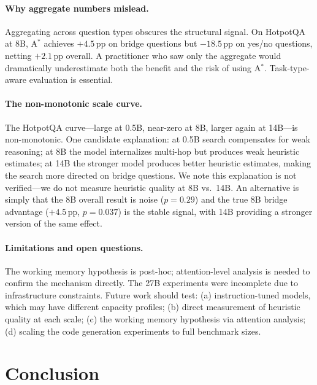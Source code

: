 \documentclass{article}
\newcommand{\astar}{A$^*$\xspace}
\begin{document}
\paragraph{Why aggregate numbers mislead.}
Aggregating across question types obscures the structural signal. On HotpotQA at 8B, \astar achieves $+4.5$\,pp on bridge questions but $-18.5$\,pp on yes/no questions, netting $+2.1$\,pp overall. A practitioner who saw only the aggregate would dramatically underestimate both the benefit and the risk of using \astar. Task-type-aware evaluation is essential.

\paragraph{The non-monotonic scale curve.}
The HotpotQA curve---large at 0.5B, near-zero at 8B, larger again at 14B---is non-monotonic.
One candidate explanation: at 0.5B search compensates for weak reasoning; at 8B the model internalizes multi-hop but produces weak heuristic estimates; at 14B the stronger model produces better heuristic estimates, making the search more directed on bridge questions.
We note this explanation is not verified---we do not measure heuristic quality at 8B vs.\ 14B.
An alternative is simply that the 8B overall result is noise ($p=0.29$) and the true 8B bridge advantage ($+4.5$\,pp, $p=0.037$) is the stable signal, with 14B providing a stronger version of the same effect.

\paragraph{Limitations and open questions.}
The working memory hypothesis is post-hoc; attention-level analysis is needed to confirm the mechanism directly.
The 27B experiments were incomplete due to infrastructure constraints.
Future work should test: (a) instruction-tuned models, which may have different capacity profiles; (b) direct measurement of heuristic quality at each scale; (c) the working memory hypothesis via attention analysis; (d) scaling the code generation experiments to full benchmark sizes.

\section{Conclusion}
\label{sec:conclusion}
\end{document}
